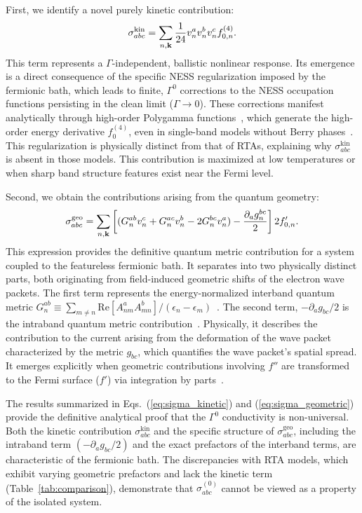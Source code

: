 \documentclass[twocolumn, prx, reprint, amsfonts, amsmath, amssymb, longbibliography, floatfix, aps]{revtex4-2}
\begin{document}
First, we identify a novel purely kinetic contribution:
\begin{equation}
\sigma^{\text{kin}}_{abc} = \sum_{n,{\bf k}} \frac{1}{24} v_n^a v_n^b v_n^c f_{0,n}^{(4)}.
\label{eq:sigma_kinetic}
\end{equation}
This term represents a $\Gamma$-independent, ballistic nonlinear response.
Its emergence is a direct consequence of the specific NESS regularization imposed by the fermionic bath, which leads to finite, $\Gamma^0$ corrections to the NESS occupation functions persisting in the clean limit ($\Gamma\to 0$). 
These corrections manifest analytically through high-order Polygamma functions~\cite{supplemental}, which generate the high-order energy derivative $f^{(4)}_0$, even in single-band models without Berry phases~\cite{matsyshyn2023fermi}. 
This regularization is physically distinct from that of RTAs, explaining why $\sigma_{abc}^{\text{kin}}$ is absent in those models.
This contribution is maximized at low temperatures or when sharp band structure features exist near the Fermi level.

Second, we obtain the contributions arising from the quantum geometry:
\begin{equation}
\sigma^{\text{geo}}_{abc} = \sum_{n,{\bf k}} \left[ (G_n^{ab} v_n^c + G_n^{ac} v_n^b - 2 G_n^{bc} v_n^a) -\frac{\partial_a g_n^{bc}}{2} \right] 2 f_{0,n}'.
\label{eq:sigma_geometric}
\end{equation}
This expression provides the definitive quantum metric contribution for a system coupled to the featureless fermionic bath. 
It separates into two physically distinct parts, both originating from field-induced geometric shifts of the electron wave packets.
The first term represents the energy-normalized interband quantum metric $G^{ab}_{n} \equiv \sum_{m\neq n}\text{Re}[A^{a}_{nm}A^{b}_{mn}]/(\epsilon_{n} - \epsilon_m)$~\cite{gao2014field, das2023intrinsic, kaplan2024unification}.
The second term, $-\partial_a g_{bc}/2$ is the intraband quantum metric contribution~\cite{ulrich2025quantum}.
Physically, it describes the contribution to the current arising from the deformation of the wave packet characterized by the metric $g_{bc}$, which quantifies the wave packet's spatial spread. 
It emerges explicitly when geometric contributions involving $f''$ are transformed to the Fermi surface ($f'$) via integration by parts~\cite{supplemental}.

The results summarized in Eqs.~(\ref{eq:sigma_kinetic}) and (\ref{eq:sigma_geometric}) provide the definitive analytical proof that the $\Gamma^0$ conductivity is non-universal. 
Both the kinetic contribution $\sigma_{a b c}^{\text{kin}}$ and the specific structure of $\sigma_{a b c}^{\text{geo}}$, including the intraband term $(-\partial_a g_{b c} / 2)$ and the exact prefactors of the interband terms, are characteristic of the fermionic bath. 
The discrepancies with RTA models, which exhibit varying geometric prefactors and lack the kinetic term (Table~\ref{tab:comparison}), demonstrate that $\sigma_{a b c}^{(0)}$ cannot be viewed as a property of the isolated system.
\end{document}
